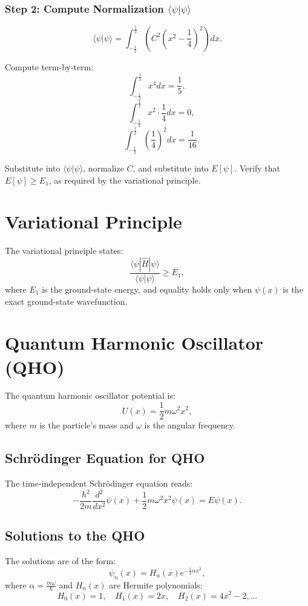 \documentclass[a4paper,12pt]{article}
\begin{document}
\begin{multicols}{2}
\subsubsection*{Step 2: Compute Normalization \( \langle \psi | \psi \rangle \)}
\[
\langle \psi | \psi \rangle = \int_{-\frac{1}{2}}^{\frac{1}{2}} \left(C^2 \left(x^2 - \frac{1}{4}\right)^2\right) dx.
\]

Compute term-by-term:
\[
\int_{-\frac{1}{2}}^{\frac{1}{2}} x^4 dx = \frac{1}{5},
\]
\[
\quad \int_{-\frac{1}{2}}^{\frac{1}{2}} x^2 \cdot \frac{1}{4} dx = 0,
\]
\[
\quad \int_{-\frac{1}{2}}^{\frac{1}{2}} \left(\frac{1}{4}\right)^2 dx = \frac{1}{16}.
\]

Substitute into \( \langle \psi | \psi \rangle \), normalize \( C \), and substitute into \( E[\psi] \). Verify that \( E[\psi] \geq E_1 \), as required by the variational principle.

\section{Variational Principle}
The variational principle states:
\[
\frac{\langle \psi | \hat{H} | \psi \rangle}{\langle \psi | \psi \rangle} \geq E_1,
\]
where \( E_1 \) is the ground-state energy, and equality holds only when \( \psi(x) \) is the exact ground-state wavefunction.

\section{Quantum Harmonic Oscillator (QHO)}

The quantum harmonic oscillator potential is:
\[
U(x) = \frac{1}{2}m\omega^2x^2,
\]
where \( m \) is the particle's mass and \( \omega \) is the angular frequency.

\subsection*{Schrödinger Equation for QHO}
The time-independent Schrödinger equation reads:
\[
-\frac{\hbar^2}{2m} \frac{d^2}{dx^2} \psi(x) + \frac{1}{2}m\omega^2x^2 \psi(x) = E \psi(x).
\]

\subsection*{Solutions to the QHO}
The solutions are of the form:
\[
\psi_n(x) = H_n(x) e^{-\frac{1}{2}\alpha x^2},
\]
where \( \alpha = \frac{m\omega}{\hbar} \) and \( H_n(x) \) are Hermite polynomials:
\[
H_0(x) = 1, \quad H_1(x) = 2x, \quad H_2(x) = 4x^2 - 2, \dots
\]


\end{multicols}
\end{document}
